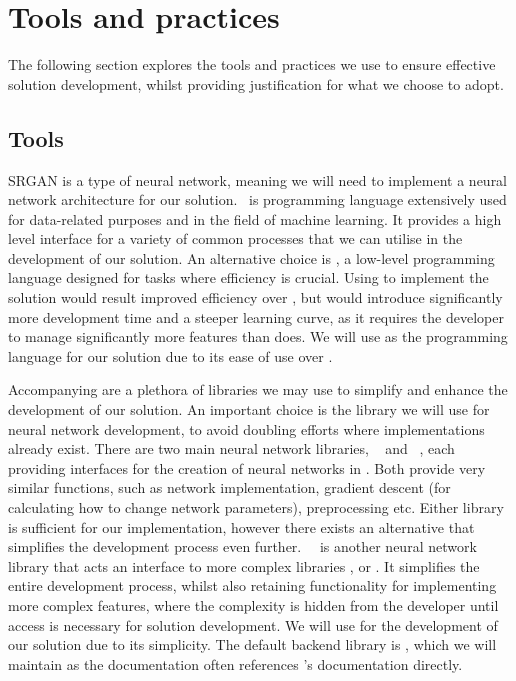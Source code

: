 \section{Tools and practices}\label{sec:tools_and_practices}
The following section explores the tools and practices we use to ensure effective solution development, whilst providing justification for what we choose to adopt.

\subsection{Tools}
SRGAN is a type of neural network, meaning we will need to implement a neural network architecture for our solution.\  is programming language extensively used for data-related purposes and in the field of machine learning. It provides a high level interface for a variety of common processes that we can utilise in the development of our solution. An alternative choice is , a low-level programming language designed for tasks where efficiency is crucial. Using  to implement the solution would result improved efficiency over , but would introduce significantly more development time and a steeper learning curve, as it requires the developer to manage significantly more features than  does. We will use  as the programming language for our solution due to its ease of use over .

Accompanying  are a plethora of libraries we may use to simplify and enhance the development of our solution. An important choice is the library we will use for neural network development, to avoid doubling efforts where implementations already exist. There are two main neural network libraries, ~\cite{tensorflow} and ~\cite{pytorch}, each providing interfaces for the creation of neural networks in . Both provide very similar functions, such as network implementation, gradient descent (for calculating how to change network parameters), preprocessing etc. Either library is sufficient for our implementation, however there exists an alternative that simplifies the development process even further.\ ~\cite{keras} is another neural network library that acts an interface to more complex libraries ,  or . It simplifies the entire development process, whilst also retaining functionality for implementing more complex features, where the complexity is hidden from the developer until access is necessary for solution development. We will use  for the development of our solution due to its simplicity. The default backend library is , which we will maintain as the  documentation often references 's documentation directly.

